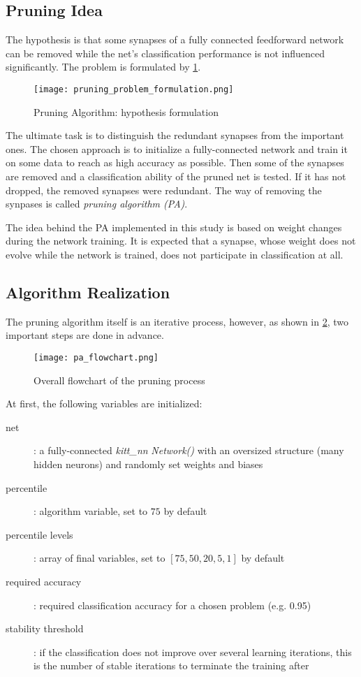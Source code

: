 \subsection{Pruning Idea} \label{ssec:pa_idea}
The hypothesis is that some synapses of a fully connected feedforward network can be removed while the net's classification performance is not influenced significantly.  The problem is formulated by \cref{img:pruning_problem_formulation}.

\begin{figure}[H]
  \centering
  \texttt{[image: pruning\_problem\_formulation.png]}
  \caption{Pruning Algorithm: hypothesis formulation}
  \label{img:pruning_problem_formulation}
\end{figure}

The ultimate task is to distinguish the redundant synapses from the important ones. The chosen approach is to initialize a fully-connected network and train it on some data to reach as high accuracy as possible. Then some of the synapses are removed and a classification ability of the pruned net is tested. If it has not dropped, the removed synapses were redundant. The way of removing the synpases is called \textit{pruning algorithm (PA)}.

The idea behind the PA implemented in this study is based on weight changes during the network training. It is expected that a synapse, whose weight does not evolve while the network is trained, does not participate in classification at all. 

\subsection{Algorithm Realization} \label{ssec:pa_realization}
The pruning algorithm itself is an iterative process, however, as shown in \cref{img:pa_flowchart}, two important steps are done in advance.

\begin{figure}[H]
  \centering
  \texttt{[image: pa\_flowchart.png]}
  \caption{Overall flowchart of the pruning process}
  \label{img:pa_flowchart}
\end{figure}

At first, the following variables are initialized:

\begin{description}
\item[net] : a fully-connected \textit{kitt\_nn} \textit{Network()} with an oversized structure (many hidden neurons) and randomly set weights and biases
\item[percentile] : algorithm variable, set to $ 75 $ by default
\item[percentile levels] : array of final variables, set to $ [75, 50, 20, 5, 1] $ by default
\item[required accuracy] : required classification accuracy for a chosen problem (e.g. 0.95)
\item[stability threshold] : if the classification does not improve over several learning iterations, this is the number of stable iterations to terminate the training after
\end{description}

